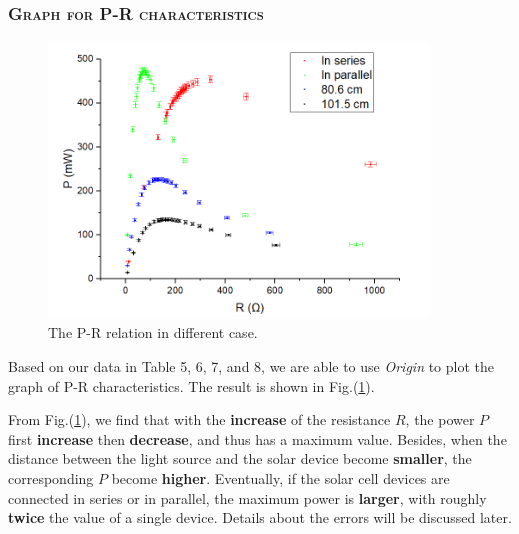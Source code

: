 \documentclass[a4paper,12pt]{article}
\begin{document}
\subsubsection{\textsc{Graph for P-R characteristics}}

\begin{figure}[H] 
    \centering
    \includegraphics[width=0.9\textwidth]{PR} 
    \caption{The P-R relation in different case.} 
    \label{PR}    
\end{figure}

Based on our data in Table 5, 6, 7, and 8, we are able to use \textit{Origin} to plot the graph of P-R characteristics. The result is shown in Fig.(\ref{PR}).

\par From Fig.(\ref{PR}), we find that with the \textbf{increase} of the resistance $R$, the power $P$ first \textbf{increase} then \textbf{decrease}, and thus has a maximum value. Besides, when the distance between the light source and the solar device become \textbf{smaller}, the corresponding $P$ become \textbf{higher}. Eventually, if the solar cell devices are connected in series or in parallel, the maximum power is \textbf{larger}, with roughly \textbf{twice} the value of a single device. Details about the errors will be discussed later.
\end{document}
